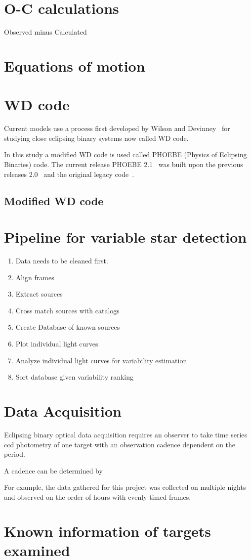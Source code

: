 \section{O-C calculations}
Observed minus Calculated

\section{Equations of motion}

\section{WD code}
Current models use a process first developed by Wilson and Devinney~\cite{wilson_devinney_1971} for studying close eclipsing binary systems now 
called WD code.

In this study a modified WD code is used called PHOEBE (Physics of Eclipsing Binaries) code.
The current release PHOEBE 2.1~\cite{horvat_2018} was built upon the previous releases 2.0~\cite{prsa_2016}
and the original legacy code~\cite{prsa_2005}. 


\subsection{Modified WD code}

\section{Pipeline for variable star detection}
\begin{enumerate}
    \item Data needs to be cleaned first.
    \item Align frames
    \item Extract sources
    \item Cross match sources with catalogs
    \item Create Database of known sources
    \item Plot individual light curves
    \item Analyze individual light curves for variability estimation
    \item Sort database given variability ranking
\end{enumerate}

\section{Data Acquisition}
Eclipsing binary optical data acquisition requires an observer to take time series ccd photometry of one target with an observation cadence dependent on the period.

A cadence can be determined by 

For example, the data gathered for this project was collected on multiple nights and observed on the order of hours with evenly timed frames.

\section{Known information of targets examined}

